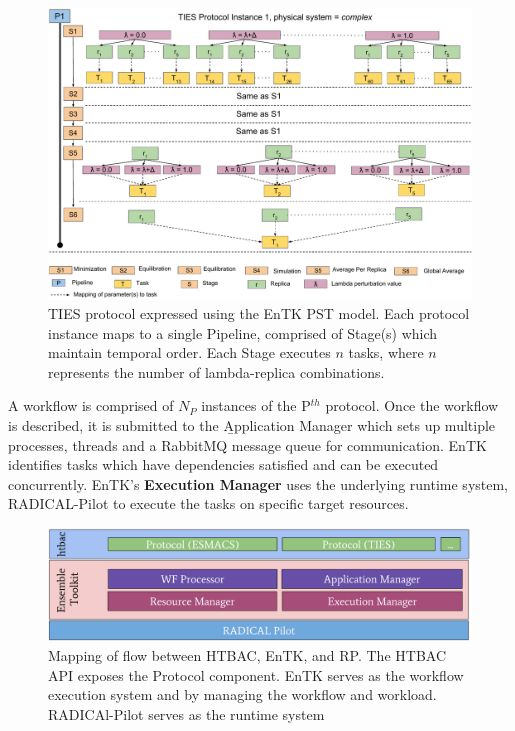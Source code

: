\begin{figure}
  \centering
   \includegraphics[width=\columnwidth]{figures/_TIES_EnTK_implementation.pdf}
  \caption{TIES protocol expressed using the EnTK PST model. Each protocol instance
  maps to a single Pipeline, comprised of Stage(s) which maintain temporal order. 
  Each Stage executes $n$ tasks, where $n$ represents the number of lambda-replica
  combinations.}
\label{fig:pst}
\end{figure}






A workflow is comprised of $N_P$ instances of the P$^{th}$ protocol. Once the
workflow is described, it is submitted to the
\b{Application Manager} which sets up multiple processes, threads and a
RabbitMQ message queue for communication. EnTK identifies tasks which have
dependencies satisfied and can be executed concurrently. EnTK's
\textbf{Execution Manager} uses the underlying runtime system, RADICAL-Pilot
to execute the tasks on specific target resources. 

\begin{figure}
  \centering
   \includegraphics[width=\columnwidth]{figures/isc_htbac_integration_with_entk_RP-4.pdf}
  \caption{Mapping of flow between HTBAC, EnTK, and RP. The HTBAC API exposes the Protocol
  component. EnTK serves as the workflow execution system and
  by managing the workflow and workload. RADICAl-Pilot serves as the runtime system}
\label{fig:integration}
\end{figure}


